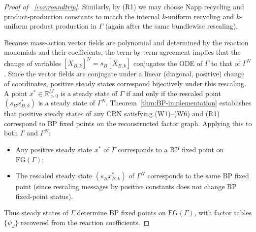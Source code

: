 \documentclass{article}
\theoremstyle{plain}
\theoremstyle{definition}
\theoremstyle{remark}
\newcommand{\<}{\langle}
\renewcommand{\>}{\rangle}
\begin{document}
\begin{proof}[Proof of ~\ref{cor:roundtrip}]
Similarly, by (R1) we may choose Napp recycling and product-production constants to 
match the internal $k$-uniform recycling and $k$-uniform product production in $\Gamma$ 
(again after the same bundlewise rescaling).

Because mass-action vector fields are polynomial and determined by the reaction 
monomials and their coefficients, the term-by-term agreement implies that the change 
of variables $[X_{B,k}]^N = s_B [X_{B,k}]$ conjugates the ODE of $\Gamma$ to that 
of $\Gamma^N$.
Since the vector fields are conjugate under a linear (diagonal, positive) change of 
coordinates, positive steady states correspond bijectively under this rescaling. 
A point $x^* \in \mathbb{R}^M_{>0}$ is a steady state of $\Gamma$ if and only if 
the rescaled point $(s_B x^*_{B,k})$ is a steady state of $\Gamma^N$.
Theorem~\ref{thm:BP-implementation} establishes that positive steady states of any 
CRN satisfying (W1)--(W6) and (R1) correspond to BP fixed points on the reconstructed 
factor graph. Applying this to both $\Gamma$ and $\Gamma^N$:
\begin{itemize}
\item Any positive steady state $x^*$ of $\Gamma$ corresponds to a BP fixed point on 
$\mathrm{FG}(\Gamma)$;
\item The rescaled steady state $(s_B x^*_{B,k})$ of $\Gamma^N$ corresponds to the 
same BP fixed point (since rescaling messages by positive constants does not change 
BP fixed-point status).
\end{itemize}

Thus steady states of $\Gamma$ determine BP fixed points on $\mathrm{FG}(\Gamma)$, 
with factor tables $\{\psi_J\}$ recovered from the reaction coefficients.
\end{proof}
\end{document}
